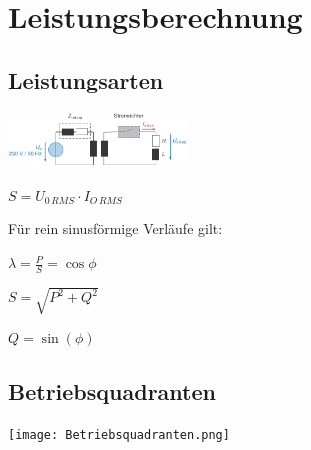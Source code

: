 \documentclass[german]{latex4ei/latex4ei_sheet}
\begin{document}
\section{Leistungsberechnung}
	\begin{sectionbox}
		\subsection{Leistungsarten}
			\begin{bluebox}
				\item \includegraphics[width=180px]{img/Leistungsarten.png}
				\item $S = U_{0\,RMS} \cdot I_{O\,RMS}$
				\item Für rein sinusförmige Verläufe gilt:
				\item $\lambda = \frac{P}{S} = \cos \phi$
				\item $S = \sqrt{P^2+Q^2}$
				\item $Q = \sin(\phi)$
			\end{bluebox}
		\subsection{Betriebsquadranten}
			\begin{symbolbox}
				\item \texttt{[image: Betriebsquadranten.png]}
			\end{symbolbox}
	\end{sectionbox}
\end{document}
